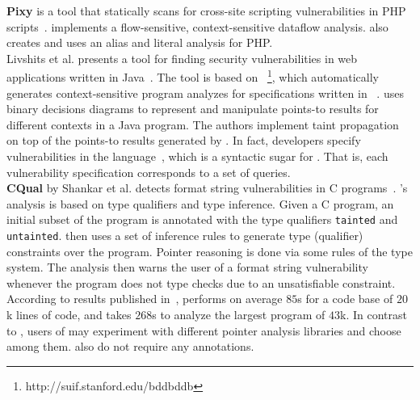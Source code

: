 \textbf{Pixy} is a tool that statically scans for cross-site
scripting vulnerabilities in PHP scripts~\cite{Jovanovic:2006:Pixy}.
\pixy implements a flow-sensitive, context-sensitive dataflow analysis.
\pixy also creates and uses an alias and literal analysis for PHP.\\

Livshits et al. presents a tool for finding security
vulnerabilities in web applications written in Java~\cite{livshits05finding}.
The tool is based on \bddbddb~\footnote{http://suif.stanford.edu/bddbddb},
which automatically generates context-sensitive program analyzes
for specifications written in \datalog~\cite{Ullman:1988:datalog}.
\bddbddb uses binary decisions diagrams to represent and manipulate
points-to results for different contexts in a Java program. The authors
implement taint propagation on top of the points-to results generated
by \bddbddb.
In fact, developers specify vulnerabilities in the \pql
language~\cite{Martin:2005:PQL}, which is a syntactic sugar for \datalog. 
That is, each vulnerability specification corresponds to a set of
\pql queries.\\

\textbf{CQual} by Shankar et al. detects format string
vulnerabilities in C programs~\cite{Shankar:2001:DFS}.
\cqual's analysis is based on type qualifiers\cite{Foster:1999:TTQ}
and type inference. 
Given a C program, an initial subset of the program is annotated
with the type qualifiers \texttt{tainted} and \texttt{untainted}.
\cqual then uses a set of inference rules to generate type (qualifier)
constraints over the program. 
Pointer reasoning is done via some rules of the type system.
The analysis then warns the user of a format string vulnerability
whenever the program does not type checks due to an unsatisfiable
constraint. According to results published in~\cite{Shankar:2001:DFS},
\cqual performs on average $85$s for a code base of $20$k lines of code,
and takes $268$s to analyze the largest program of $43$k.
In contrast to \cqual, users of \waint may experiment with different pointer
analysis libraries and choose among them. \waint also do not require
any annotations.

